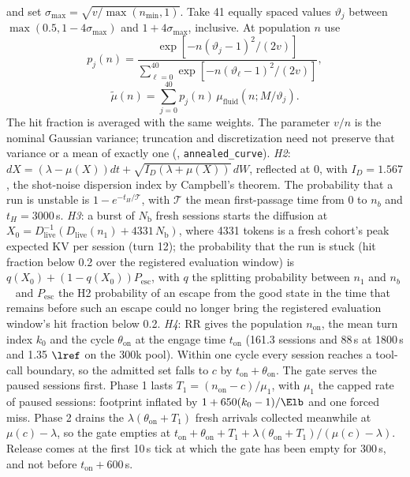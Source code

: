 and set $\sigma_{\max}=\sqrt{v/\max(n_{\min},1)}$. Take 41 equally spaced values $\vartheta_j$ between $\max(0.5,1-4\sigma_{\max})$ and $1+4\sigma_{\max}$, inclusive. At population $n$ use
\[
p_j(n)=\frac{\exp[-n(\vartheta_j-1)^2/(2v)]}{\sum_{\ell=0}^{40}\exp[-n(\vartheta_\ell-1)^2/(2v)]},
\]
\[
\widetilde\mu(n)=\sum_{j=0}^{40}p_j(n)\,\mu_{\mathrm{fluid}}(n;M/\vartheta_j).
\]
The hit fraction is averaged with the same weights. The parameter $v/n$ is the nominal Gaussian variance; truncation and discretization need not preserve that variance or a mean of exactly one (, \texttt{annealed\_curve}). \emph{H2}: $dX=(\lambda-\mu(X))dt+\sqrt{I_D(\lambda+\mu(X))}\,dW$, reflected at 0, with $I_D=1.567$, the shot-noise dispersion index by Campbell's theorem. The probability that a run is unstable is $1-e^{-t_H/\mathcal T}$, with $\mathcal T$ the mean first-passage time from 0 to $n_b$ and $t_H=3000$\,s. \emph{H3}: a burst of $N_{\mathrm b}$ fresh sessions starts the diffusion at $X_0=D_{\mathrm{live}}^{-1}(D_{\mathrm{live}}(n_1)+4331\,N_{\mathrm b})$, where 4331 tokens is a fresh cohort's peak expected KV per session (turn 12); the probability that the run is stuck (hit fraction below 0.2 over the registered evaluation window) is $q(X_0)+(1-q(X_0))P_{\mathrm{esc}}$, with $q$ the splitting probability between $n_1$ and $n_b$~\citep{karlin1981second} and $P_{\mathrm{esc}}$ the H2 probability of an escape from the good state in the time that remains before such an escape could no longer bring the registered evaluation window's hit fraction below 0.2. \emph{H4}: RR gives the population $n_{\mathrm{on}}$, the mean turn index $k_0$ and the cycle $\theta_{\mathrm{on}}$ at the engage time $t_{\mathrm{on}}$ (161.3 sessions and 88\,s at 1800\,s and 1.35 $\lref$ on the 300k pool). Within one cycle every session reaches a tool-call boundary, so the admitted set falls to $c$ by $t_{\mathrm{on}}+\theta_{\mathrm{on}}$. The gate serves the paused sessions first. Phase 1 lasts $T_1=(n_{\mathrm{on}}-c)/\mu_1$, with $\mu_1$ the capped rate of paused sessions: footprint inflated by $1+650(k_0-1)/\Elb$ and one forced miss. Phase 2 drains the $\lambda(\theta_{\mathrm{on}}+T_1)$ fresh arrivals collected meanwhile at $\mu(c)-\lambda$, so the gate empties at $t_{\mathrm{on}}+\theta_{\mathrm{on}}+T_1+\lambda(\theta_{\mathrm{on}}+T_1)/(\mu(c)-\lambda)$. Release comes at the first 10\,s tick at which the gate has been empty for 300\,s, and not before $t_{\mathrm{on}}+600$\,s.

